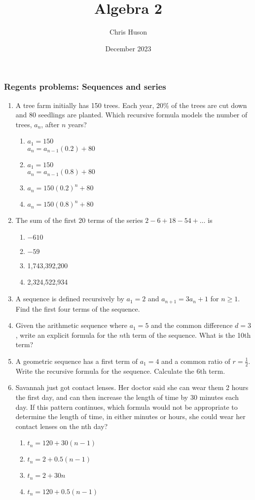 \documentclass[12pt, twoside]{article}
\title{Algebra 2}
\author{Chris Huson}
\date{December 2023}
\begin{document}
\subsubsection*{Regents problems: Sequences and series}
\begin{enumerate}[itemsep=0.5cm]
\item A tree farm initially has 150 trees. Each year, 20\% of the trees are cut down and 80 seedlings are planted. Which recursive formula models the number of trees, $a_n$, after $n$ years? %
\begin{enumerate}
    \item $a_1 = 150$ \\ $a_n = a_{n-1}(0.2) + 80$
    \item $a_1 = 150$ \\ $a_n = a_{n-1}(0.8) + 80$
    \item $a_n = 150(0.2)^n + 80$
    \item $a_n = 150(0.8)^n + 80$
\end{enumerate}

\item The sum of the first 20 terms of the series \(2 - 6 + 18 - 54 + \ldots\) is %
\begin{enumerate}
    \item $-610$
    \item $-59$
    \item 1,743,392,200
    \item 2,324,522,934
\end{enumerate}

\item A sequence is defined recursively by \( a_1 = 2 \) and \( a_{n+1} = 3a_n + 1 \) for \( n \geq 1 \). Find the first four terms of the sequence.

\item Given the arithmetic sequence where \( a_1 = 5 \) and the common difference \( d = 3 \), write an explicit formula for the \( n \)th term of the sequence. What is the 10th term?

\item A geometric sequence has a first term of \( a_1 = 4 \) and a common ratio of \( r = \frac{1}{2} \). Write the recursive formula for the sequence. Calculate the 6th term.


\item Savannah just got contact lenses. Her doctor said she can wear them 2 hours the first day, and can then increase the length of time by 30 minutes each day. If this pattern continues, which formula would not be appropriate to determine the length of time, in either minutes or hours, she could wear her contact lenses on the nth day?
\begin{enumerate}
    \item \( t_n = 120 + 30(n-1) \)
    \item \( t_n = 2 + 0.5(n-1) \)
    \item \( t_n = 2 + 30n \)
    \item \( t_n = 120 + 0.5(n-1) \)
\end{enumerate}


\end{enumerate}
\end{document}
